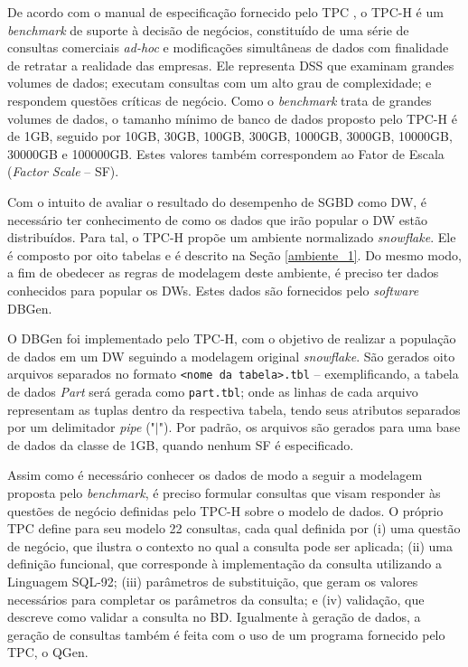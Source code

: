 De acordo com o manual de especificação fornecido pelo TPC \cite{tpc2017specs}, o TPC-H é um \textit{\textit{benchmark}} de suporte à decisão de negócios, constituído de uma série de consultas comerciais \textit{ad-hoc} e modificações simultâneas de dados com finalidade de retratar a realidade das empresas. Ele representa DSS que examinam grandes volumes de dados; executam consultas com um alto grau de complexidade; e respondem questões críticas de negócio. Como o \textit{\textit{benchmark}} trata de grandes volumes de dados, o tamanho mínimo de banco de dados proposto pelo TPC-H é de 1GB, seguido por 10GB, 30GB, 100GB, 300GB, 1000GB, 3000GB, 10000GB, 30000GB e 100000GB. Estes valores também correspondem ao Fator de Escala (\textit{Factor Scale} -- SF). 

Com o intuito de avaliar o resultado do desempenho de SGBD como DW, é necessário ter conhecimento de como os dados que irão popular o DW estão distribuídos. Para tal, o TPC-H propõe um ambiente normalizado \textit{snowflake}. Ele é composto por oito tabelas e é descrito na Seção \ref{ambiente_1}. Do mesmo modo, a fim de obedecer as regras de modelagem deste ambiente, é preciso ter dados conhecidos para popular os DWs. Estes dados são fornecidos pelo \textit{software} DBGen.

O DBGen foi implementado pelo TPC-H, com o objetivo de realizar a população de dados em um DW seguindo a modelagem original \textit{snowflake}. São gerados oito arquivos separados no formato \texttt{<nome da tabela>.tbl} -- exemplificando, a tabela de dados \textit{Part} será gerada como \texttt{part.tbl}; onde as linhas de cada arquivo representam as tuplas dentro da respectiva tabela, tendo seus atributos separados por um delimitador \textit{pipe} ("$\mid$"). Por padrão, os arquivos são gerados para uma base de dados da classe de 1GB, quando nenhum SF é especificado.

Assim como é necessário conhecer os dados de modo a seguir a modelagem proposta pelo \textit{benchmark}, é preciso formular consultas que visam responder às questões de negócio definidas pelo TPC-H sobre o modelo de dados. O próprio TPC define para seu modelo 22 consultas, cada qual definida por (i) uma questão de negócio, que ilustra o contexto no qual a consulta pode ser aplicada; (ii) uma definição funcional, que corresponde à implementação da consulta utilizando a Linguagem SQL-92; (iii) parâmetros de substituição, que geram os valores necessários para completar os parâmetros da consulta; e (iv) validação, que descreve como validar a consulta no BD. Igualmente à geração de dados, a geração de consultas também é feita com o uso de um programa fornecido pelo TPC, o QGen.

